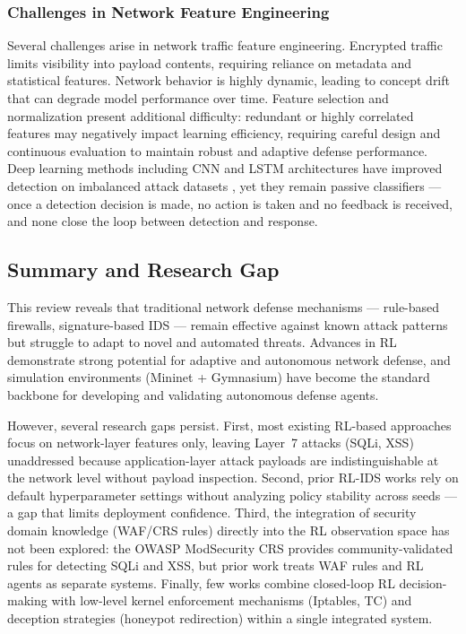 \documentclass[conference]{IEEEtran}
\begin{document}
\subsubsection{Challenges in Network Feature Engineering}
Several challenges arise in network traffic feature engineering. Encrypted
traffic limits visibility into payload contents, requiring reliance on
metadata and statistical features. Network behavior is highly dynamic,
leading to concept drift that can degrade model performance over time.
Feature selection and normalization present additional difficulty: redundant
or highly correlated features may negatively impact learning efficiency,
requiring careful design and continuous evaluation to maintain robust and
adaptive defense performance. Deep learning methods including CNN and LSTM
architectures have improved detection on imbalanced attack datasets
\cite{ring2019survey}, yet they remain passive classifiers --- once a
detection decision is made, no action is taken and no feedback is received,
and none close the loop between detection and response.

\subsection{Summary and Research Gap}

This review reveals that traditional network defense mechanisms --- rule-based
firewalls, signature-based IDS --- remain effective against known attack
patterns but struggle to adapt to novel and automated threats. Advances in
RL demonstrate strong potential for adaptive and autonomous network defense,
and simulation environments (Mininet + Gymnasium) have become the standard
backbone for developing and validating autonomous defense agents.

However, several research gaps persist. First, most existing RL-based
approaches focus on network-layer features only, leaving Layer~7 attacks
(SQLi, XSS) unaddressed because application-layer attack payloads are
indistinguishable at the network level without payload inspection. Second,
prior RL-IDS works rely on default hyperparameter settings without analyzing
policy stability across seeds --- a gap that limits deployment confidence.
Third, the integration of security domain knowledge (WAF/CRS rules) directly
into the RL observation space has not been explored: the OWASP ModSecurity
CRS \cite{owaspCRS2023} provides community-validated rules for detecting
SQLi and XSS, but prior work treats WAF rules and RL agents as separate
systems. Finally, few works combine closed-loop RL decision-making with
low-level kernel enforcement mechanisms (Iptables, TC) and deception
strategies (honeypot redirection) within a single integrated system.
\end{document}
